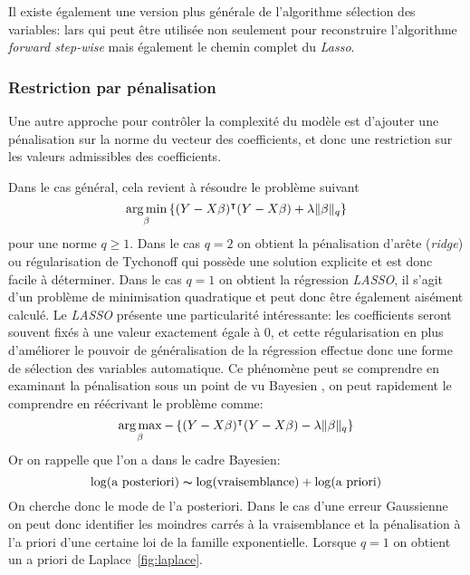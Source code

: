 Il existe également une version plus générale de l'algorithme sélection des variables: \ac{lars} \citep{Efron2003} qui peut être utilisée non seulement pour reconstruire l'algorithme \emph{forward step-wise} mais également le chemin complet du \emph{Lasso}.

\subsubsection{Restriction par pénalisation}

Une autre approche pour contrôler la complexité du modèle est d'ajouter une pénalisation sur la norme du vecteur des coefficients, et donc une restriction sur les valeurs admissibles des coefficients.

Dans le cas général, cela revient à résoudre le problème suivant
\begin{equation*}
    \operatorname*{arg\,min}_\beta \left\{ (Y - X \beta)^\intercal ( Y - X \beta ) + \lambda \Vert \beta \Vert_q  \right\}
\end{equation*}
pour une norme $q \geq 1$. Dans le cas $q=2$ on obtient la pénalisation d'arête (\emph{ridge}) ou régularisation de Tychonoff qui possède une solution explicite et est donc facile à déterminer. Dans le cas $q=1$ on obtient la régression \emph{LASSO}, il s'agit d'un problème de minimisation quadratique et peut donc être également aisément calculé. Le \emph{LASSO} présente une particularité intéressante: les coefficients seront souvent fixés à une valeur exactement égale à $0$, et cette régularisation en plus d'améliorer le pouvoir de généralisation de la régression effectue donc une forme de sélection des variables automatique. Ce phénomène peut se comprendre en examinant la pénalisation sous un point de vu Bayesien \citep{Park2008}, on peut rapidement le comprendre en réécrivant le problème comme:
\begin{equation*}
    \operatorname*{arg\,max}_\beta -\left\{ (Y - X \beta)^\intercal ( Y - X \beta ) - \lambda \Vert \beta \Vert_q  \right\}
\end{equation*}
Or on rappelle que l'on a dans le cadre Bayesien:
\begin{equation*}
    \log ( \text{a posteriori} ) \thicksim \log (\text{vraisemblance}) + \log(\text{a priori})
\end{equation*}
On cherche donc le mode de l'a posteriori. Dans le cas d'une erreur Gaussienne on peut donc identifier les moindres carrés à la vraisemblance et la pénalisation à l'a priori d'une certaine loi de la famille exponentielle. Lorsque $q = 1$ on obtient un a priori de Laplace~\ref{fig:laplace}.

